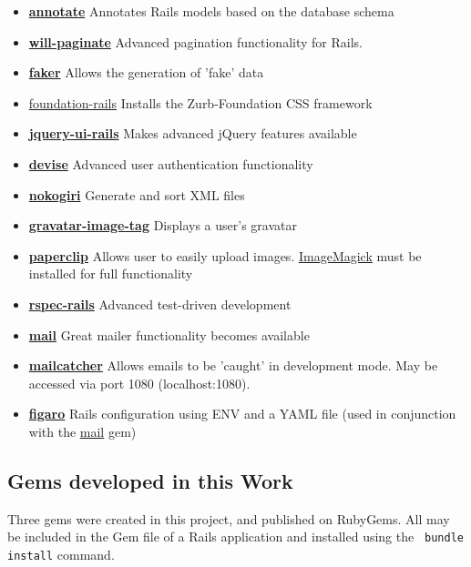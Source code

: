 \documentclass[11pt]{article}
\begin{document}
\begin{itemize}[itemsep=1ex,leftmargin=1cm,rightmargin=1cm]
\item[] \textbf{\href{https://rubygems.org/gems/annotate}{annotate}}
 Annotates Rails models based on the database schema
\item[] \textbf{\href{https://github.com/mislav/will_paginate/wiki}{will-paginate}} Advanced pagination functionality for Rails.
\item[] \textbf{\href{https://rubygems.org/gems/faker}{faker}} Allows the generation of 'fake' data
\item[]\href{http://zurb.com/}{foundation-rails} Installs the Zurb-Foundation CSS framework
\item[] \textbf{\href{https://github.com/joliss/jquery-ui-rails}{jquery-ui-rails}} Makes advanced jQuery features available 
\item[] \textbf{\href{https://github.com/plataformatec/devise}{devise}} Advanced user authentication functionality
\item[] \textbf{\href{http://rubygems.org/gems/nokogiri}{nokogiri}} Generate and sort XML files
\item[] \textbf{\href{https://github.com/mdeering/gravatar_image_tag}{gravatar-image-tag}} Displays a user's gravatar 
\item[] \textbf{\href{http://rubygems.org/gems/paperclip}{paperclip}}  Allows user to easily upload images. \href{http://www.imagemagick.org/script/index.php}{ImageMagick} must be installed
for full functionality 
\item[] \textbf{\href{https://github.com/rspec/rspec-rails}{rspec-rails}} Advanced test-driven development 
\item[] \textbf{\href{http://rubygems.org/gems/mail}{mail}}  Great mailer functionality becomes available 
\item[] \textbf{\href{https://rubygems.org/gems/mailcatcher/}{mailcatcher}}  Allows emails to be 'caught' in 
development mode.
May be accessed via port 1080 (localhost:1080). 
\item[] \textbf{\href{http://rubygems.org/gems/figaro}{figaro}} Rails configuration using ENV and a YAML file (used in conjunction with the \href{http://rubygems.org/gems/mail}{mail} gem)

\end{itemize} 




 
\subsection{Gems developed in this Work}
Three gems were created in this project, and published on RubyGems. 
All may be included in the Gem file of a Rails application and installed 
using the \verb| bundle install| command.
\end{document}
